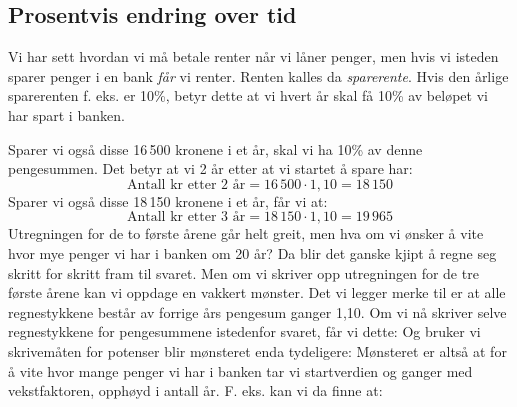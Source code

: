 \subsection{Prosentvis endring over tid}

Vi har sett hvordan vi må betale renter når vi låner penger, men hvis vi isteden sparer penger i en bank \textsl{får} vi renter. Renten kalles da \textit{sparerente}. Hvis den årlige sparerenten f. eks. er 10\%, betyr dette at vi hvert år skal få 10\% av beløpet vi har spart i banken.\vsk

\qquad
{}
Sparer vi også disse 16\,500 kronene i et år, skal vi ha 10\% av denne pengesummen. Det betyr at vi 2 år etter at vi startet å spare har:
\[ \text{Antall kr etter 2 år}=16\,500\cdot1,10=18\,150 \]
Sparer vi også disse 18\,150 kronene i et år, får vi at:
\[ \text{Antall kr etter 3 år}=18\,150\cdot1,10=19\,965 \] 
Utregningen for de to første årene går helt greit, men hva om vi ønsker å vite hvor mye penger vi har i banken om 20 år? Da blir det ganske kjipt å regne seg skritt for skritt fram til svaret. Men om vi skriver opp utregningen for de tre første årene kan vi oppdage en vakkert mønster. Det vi legger merke til er at alle regnestykkene består av forrige års pengesum ganger 1,10. Om vi nå skriver selve regnestykkene for pengesummene istedenfor svaret, får vi dette:\vs
{}
Og bruker vi skrivemåten for potenser blir mønsteret enda tydeligere:
Mønsteret er altså at for å vite hvor mange penger vi har i banken tar vi startverdien og ganger med vekstfaktoren, opphøyd i antall år. F. eks. kan vi da finne at:
